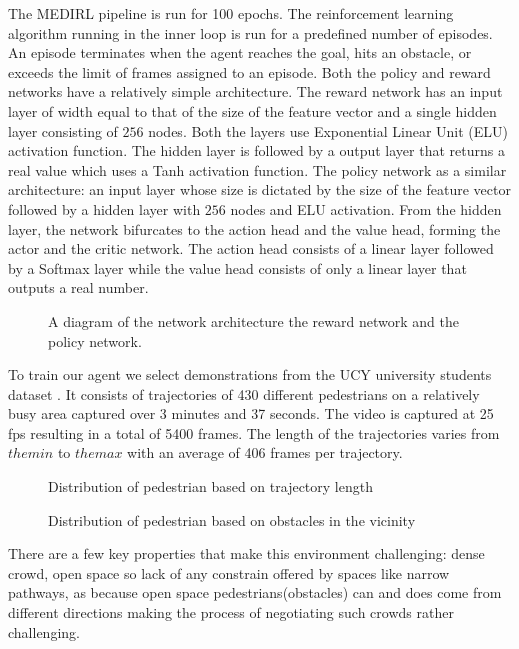 The MEDIRL pipeline is run for 100 epochs. The reinforcement learning algorithm \cite{a2c} running in the inner loop is run for a predefined number of episodes. An episode terminates when the agent reaches the goal, hits an obstacle, or exceeds the limit of frames assigned to an episode. Both the policy and reward networks have a relatively simple architecture. The reward network has an input layer of width equal to that of the size of the feature vector and a single hidden layer consisting of $256$ nodes. Both the layers use Exponential Linear Unit (ELU) \cite{elu} activation function. The hidden layer is followed by a output layer that returns a real value which uses a Tanh activation function. The policy network as a similar architecture: an input layer whose size is dictated by the size of the feature vector followed by a hidden layer with $256$ nodes and ELU activation. From the hidden layer, the network bifurcates to the action head and the value head, forming the actor and the critic network. The action head consists of a linear layer followed by a Softmax layer while the value head consists of only a linear layer that outputs a real number.

\begin{figure}
	\caption {A diagram of the network architecture the reward network and the policy network.}
\end{figure}
To train our agent we select demonstrations from the UCY university students dataset \cite{ucy-dataset-university-students}. It consists of trajectories of 430 different pedestrians on a relatively busy area captured over 3 minutes and 37 seconds. The video is captured at 25 fps resulting in a total of 5400 frames. The length of the trajectories varies from $the min$  to $the max$ with an average of 406 frames per trajectory. 
\begin{figure}
    \caption {Distribution of pedestrian based on trajectory length}
\end{figure}
\begin{figure}
    \caption {Distribution of pedestrian based on obstacles in the vicinity}
\end{figure}
There are a few key properties that make this environment challenging: dense crowd, open space so lack of any constrain offered by spaces like narrow pathways, as because open space pedestrians(obstacles) can and does come from different directions making the process of negotiating such crowds rather challenging. 

